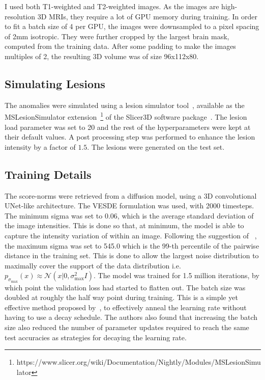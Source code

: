 I used both T1-weighted and T2-weighted images. As the images are high-resolution 3D MRIs, they require a lot of GPU memory during training. In order to fit a batch size of 4 per GPU, the images were downsampled to a pixel spacing of 2mm isotropic. They were further cropped by the largest brain mask, computed from the training data. After some padding to make the images multiples of 2, the resulting 3D volume was of size 96x112x80. 

\subsection*{Simulating Lesions}
The anomalies were simulated using a lesion simulator tool~\cite{Filho_2019}, available as the MSLesionSimulator extension~\footnote{https://www.slicer.org/wiki/Documentation/Nightly/Modules/MSLesionSimulator} of the Slicer3D software package~\cite{fedorov3DSlicerImage2012}. The lesion load parameter was set to 20 and the rest of the hyperparameters were kept at their default values. A post processing step was performed to enhance the lesion intensity by a factor of $1.5$. The lesions were generated on the test set.


\subsection*{Training Details}
The score-norms were retrieved from a diffusion model, using a 3D convolutional UNet-like architecture. The VESDE formulation was used, with 2000 timesteps. The minimum sigma was set to 0.06, which is the average standard deviation of the image intensities. This is done so that, at minimum, the model is able to capture the intensity variation of within an image. Following the suggestion of ~\cite{song2020score}, the maximum sigma was set to 545.0 which is the 99-th percentile of the pairwise distance in the training set. This is done to allow the largest noise distribution to maximally cover the support of the data distribution i.e. $p_{\sigma_\text{max}}(x) \approx \mathcal{N}(x| 0, \sigma_\text{max}^2I)$. The model was trained for 1.5 million iterations, by which point the validation loss had started to flatten out. The batch size was doubled at roughly the half way point during training. This is a simple yet effective method proposed by~\cite{le2018dont}, to effectively anneal the learning rate without having to use a decay schedule. The authors also found that increasing the batch size also reduced the number of parameter updates required to reach the same test accuracies as strategies for decaying the learning rate.

